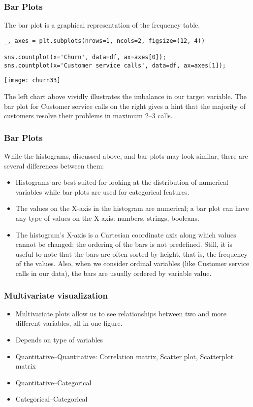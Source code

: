 \begin{frame}[fragile]\frametitle{Bar Plots}
The bar plot is a graphical representation of the frequency table.
 \begin{lstlisting}
_, axes = plt.subplots(nrows=1, ncols=2, figsize=(12, 4))

sns.countplot(x='Churn', data=df, ax=axes[0]);
sns.countplot(x='Customer service calls', data=df, ax=axes[1]);
\end{lstlisting}
\begin{center}
\texttt{[image: churn33]}
\end{center}
The left chart above vividly illustrates the imbalance in our target variable. The bar plot for Customer service calls on the right gives a hint that the majority of customers resolve their problems in maximum 2–3 calls.
\end{frame}

\begin{frame}[fragile]\frametitle{Bar Plots}
While the histograms, discussed above, and bar plots may look similar, there are several differences between them:
\begin{itemize}
\item Histograms are best suited for looking at the distribution of numerical variables while bar plots are used for categorical features.
\item The values on the X-axis in the histogram are numerical; a bar plot can have any type of values on the X-axis: numbers, strings, booleans.
\item The histogram's X-axis is a Cartesian coordinate axis along which values cannot be changed; the ordering of the bars is not predefined. Still, it is useful to note that the bars are often sorted by height, that is, the frequency of the values. Also, when we consider ordinal variables (like Customer service calls in our data), the bars are usually ordered by variable value.
\end{itemize}
\end{frame}

\begin{frame}[fragile]\frametitle{Multivariate visualization}
\begin{itemize}
\item Multivariate plots allow us to see relationships between two and more different variables, all in one figure. 
\item Depends on type of variables
\item Quantitative–Quantitative: Correlation matrix, Scatter plot, Scatterplot matrix
\item  Quantitative–Categorical
\item Categorical–Categorical
\end{itemize}

\end{frame}

